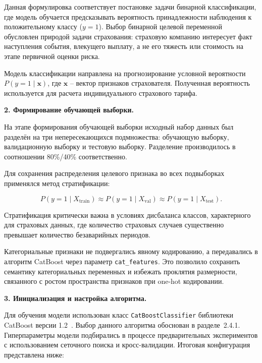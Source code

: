 Данная формулировка соответствует постановке задачи бинарной классификации, где модель обучается предсказывать вероятность принадлежности наблюдения к положительному классу ($y = 1$). Выбор бинарной целевой переменной обусловлен природой задачи страхования: страховую компанию интересует факт наступления события, влекущего выплату, а не его тяжесть или стоимость на этапе первичной оценки риска.

Модель классификации направлена на прогнозирование условной вероятности $P(y = 1 \mid \mathbf{x})$, где $\mathbf{x}$ – вектор признаков страхователя. Полученная вероятность используется для расчета индивидуального страхового тарифа.

\textbf{2. Формирование обучающей выборки.}

На этапе формирования обучающей выборки исходный набор данных был разделён на три непересекающихся подмножества: обучающую выборку, валидационную выборку и тестовую выборку. Разделение производилось в соотношении 80\%/40\% соответственно.

Для сохранения распределения целевого признака во всех подвыборках применялся метод стратификации:

\begin{equation*}
P(y = 1 \mid X_{\text{train}}) \approx P(y = 1 \mid X_{\text{val}}) \approx P(y = 1 \mid X_{\text{test}}).
\end{equation*}

Стратификация критически важна в условиях дисбаланса классов, характерного для страховых данных, где количество страховых случаев существенно превышает количество безаварийных периодов.

Категориальные признаки не подвергались явному кодированию, а передавались в алгоритм CatBoost через параметр \texttt{cat\_features}. Это позволило сохранить семантику категориальных переменных и избежать проклятия размерности, связанного с ростом пространства признаков при one-hot кодировании.

\textbf{3. Инициализация и настройка алгоритма.}

Для обучения модели использован класс \texttt{CatBoostClassifier} библиотеки CatBoost версии 1.2~\cite{catboost2026docs}. Выбор данного алгоритма обоснован в разделе~2.4.1. Гиперпараметры модели подбирались в процессе предварительных экспериментов с использованием сеточного поиска и кросс-валидации. Итоговая конфигурация представлена ниже:

